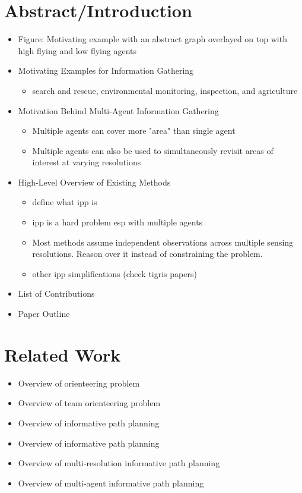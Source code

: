 \documentclass[11pt,a4paper,twoside]{article}
\begin{document}
\section*{Abstract/Introduction}
\begin{itemize}
    \item Figure: Motivating example with an abstract graph overlayed on top with high flying and low flying agents
    \item Motivating Examples for Information Gathering
    \begin{itemize}
        \item search and rescue, environmental monitoring, inspection, and agriculture
    \end{itemize}
    \item Motivation Behind Multi-Agent Information Gathering
    \begin{itemize}
        \item Multiple agents can cover more "area" than single agent
        \item Multiple agents can also be used to simultaneously revisit areas of interest at varying resolutions
    \end{itemize}
    \item High-Level Overview of Existing Methods
        \begin{itemize}
            \item define what ipp is
            \item ipp is a hard problem esp with multiple agents
            \item Most methods assume independent observations across multiple sensing resolutions. Reason over it instead of constraining the problem. 
            \item other ipp simplifications (check tigris papers)
        \end{itemize}
    \item List of Contributions
    \item Paper Outline
    
\end{itemize}

\section*{Related Work}
\begin{itemize}
    \item Overview of orienteering problem
    \item Overview of team orienteering problem
    \item Overview of informative path planning
    \item Overview of informative path planning
    \item Overview of multi-resolution informative path planning
    \item Overview of multi-agent informative path planning
\end{itemize}
\end{document}
